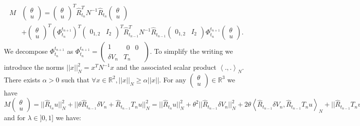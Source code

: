 \documentclass[a4paper,12pt,onecolumn]{article}
\newcommand{\RR}{{\mathbb{R}}}
\begin{document}
\begin{align*}
M & \begin{pmatrix} \theta \\ u \end{pmatrix} =  \begin{pmatrix} \theta \\ u \end{pmatrix}^T \hat{R}_{t_n}^T N^{-1} \hat{R}_{t_n} \begin{pmatrix} \theta \\ u \end{pmatrix} \\
 &+ \begin{pmatrix} \theta \\ u \end{pmatrix}^T (\Phi_{t_n}^{t_{n+1}})^T \begin{pmatrix} 0_{1,2} & I_2 \end{pmatrix}^T \hat{R}_{t_{n-1}}^T N^{-1} \hat{R}_{t_{n-1}} \begin{pmatrix} 0_{1,2} & I_2 \end{pmatrix}  \Phi_{t_n}^{t_{n+1}} \begin{pmatrix} \theta \\ u \end{pmatrix} .
\end{align*}
We decompose $ \Phi_{t_n}^{t_{n+1}}$ as $ \Phi_{t_n}^{t_{n+1}} = \begin{pmatrix} 1 & \begin{matrix} 0 & 0 \end{matrix} \\ \delta V_n & T_n \end{pmatrix}$. To simplify the writing we introduce the norms $||x||_N^2 = x^T N^{-1} x$ and the associated scalar product $ \left< .,. \right>_N$. There exists $\alpha >0$ such that $\forall x\in \RR^2, ||x||_N \geq \alpha ||x||$. For any $\begin{pmatrix} \theta \\ u \end{pmatrix} \in \RR^3$ we have 
$
M \begin{pmatrix} \theta \\ u \end{pmatrix}  = ||\hat{R}_{t_n} u||_N^2 + || \theta \hat{R}_{t_{n-1}}\delta V_n + \hat{R}_{t_{n-1}} T_n u||_N^2 
  = ||\hat{R}_{t_n} u||_N^2 + \theta^2 ||\hat{R}_{t_{n-1}} \delta V_n||_N^2 + 2\theta \left< \hat{R}_{t_{n-1}} \delta V_n,\hat{R}_{t_{n-1}} T_n u \right>_N + ||\hat{R}_{t_{n-1}} T_n u||_N^2
$
 and for $\lambda \in ]0,1]$ we have:
\end{document}

